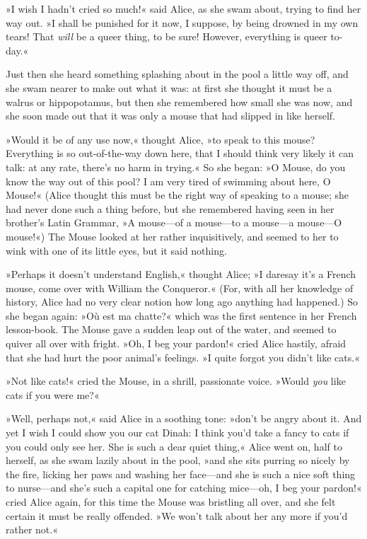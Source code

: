 »I wish I hadn't cried so much!« said Alice, as she swam about, trying to find her way out. »I shall be punished for it now, I suppose, by being drowned in my own tears! That \textit{will} be a queer thing, to be sure! However, everything is queer to-day.«



Just then she heard something splashing about in the pool a little way off, and she swam nearer to make out what it was: at first she thought it must be a walrus or hippopotamus, but then she remembered how small she was now, and she soon made out that it was only a mouse that had slipped in like herself.



»Would it be of any use now,« thought Alice, »to speak to this mouse? Everything is so out-of-the-way down here, that I should think very likely it can talk: at any rate, there's no harm in trying.« So she began: »O Mouse, do you know the way out of this pool? I am very tired of swimming about here, O Mouse!« (Alice thought this must be the right way of speaking to a mouse; she had never done such a thing before, but she remembered having seen in her brother's Latin Grammar, »A mouse—of a mouse—to a mouse—a mouse—O mouse!«) The Mouse looked at her rather inquisitively, and seemed to her to wink with one of its little eyes, but it said nothing.


»Perhaps it doesn't understand English,« thought Alice; »I daresay it's a French mouse, come over with William the Conqueror.« (For, with all her knowledge of history, Alice had no very clear notion how long ago anything had happened.) So she began again: »Où est ma chatte?« which was the first sentence in her French lesson-book. The Mouse gave a sudden leap out of the water, and seemed to quiver all over with fright. »Oh, I beg your pardon!« cried Alice hastily, afraid that she had hurt the poor animal's feelings. »I quite forgot you didn't like cats.«




»Not like cats!« cried the Mouse, in a shrill, passionate voice. »Would \textit{you} like cats if you were me?«

»Well, perhaps not,« said Alice in a soothing tone: »don't be angry about it. And yet I wish I could show you our cat Dinah: I think you'd take a fancy to cats if you could only see her. She is such a dear quiet thing,« Alice went on, half to herself, as she swam lazily about in the pool, »and she sits purring so nicely by the fire, licking her paws and washing her face—and she is such a nice soft thing to nurse—and she's such a capital one for catching mice—oh, I beg your pardon!« cried Alice again, for this time the Mouse was bristling all over, and she felt certain it must be really offended. »We won't talk about her any more if you'd rather not.«

